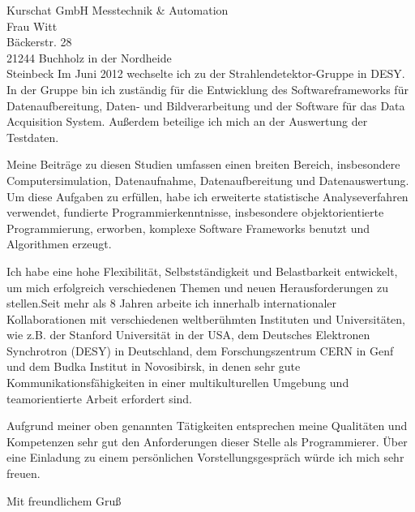 \documentclass[ebner,paper=a4,fontsize=11pt,ngerman,BCOR=10mm]{scrlttr2}%
\begin{document}
\begin{letter}{Kurschat GmbH Messtechnik \& Automation\\
Frau Witt\\
B{\"a}ckerstr. 28\\
21244 Buchholz in der Nordheide\\
Steinbeck}
Im Juni 2012 wechselte ich zu der Strahlendetektor-Gruppe in DESY. In
der Gruppe bin ich zust\"andig f\"ur die Entwicklung des
Softwareframeworks f\"ur Datenaufbereitung, Daten- und
Bildverarbeitung und der Software f\"ur das Data Acquisition
System. Au{\ss}erdem beteilige ich mich an der Auswertung der
Testdaten.

Meine Beitr\"age zu diesen Studien umfassen einen breiten Bereich,
insbesondere Computersimulation, Datenaufnahme, Datenaufbereitung und
Datenauswertung. Um diese Aufgaben zu erf{\"u}llen, habe ich
erweiterte statistische Analyseverfahren verwendet, fundierte
Programmierkenntnisse, insbesondere objektorientierte Programmierung,
erworben, komplexe Software Frameworks benutzt und Algorithmen
erzeugt.


Ich habe eine hohe Flexibilit\"at, Selbstst\"andigkeit und
Belastbarkeit entwickelt, um mich erfolgreich verschiedenen Themen und
neuen Herausforderungen zu stellen.Seit mehr als 8 Jahren arbeite ich
innerhalb internationaler Kollaborationen mit verschiedenen
weltber\"uhmten Instituten und Universit{\"a}ten, wie z.B. der
Stanford Universit{\"a}t in der USA, dem Deutsches Elektronen
Synchrotron (DESY) in Deutschland, dem Forschungszentrum CERN in Genf
und dem Budka Institut in Novosibirsk, in denen sehr gute
Kommunikationsf\"ahigkeiten in einer multikulturellen Umgebung und
teamorientierte Arbeit erfordert sind.


Aufgrund meiner oben genannten T\"atigkeiten entsprechen meine
Qualit\"aten und Kompetenzen sehr gut den Anforderungen dieser Stelle
als Programmierer. \"Uber eine Einladung zu einem pers\"onlichen
Vorstellungsgespr\"ach w\"urde ich mich sehr freuen.

\closing{Mit freundlichem Gru\ss}
\enlargethispage{6\baselineskip}

\end{letter}
\end{document}
